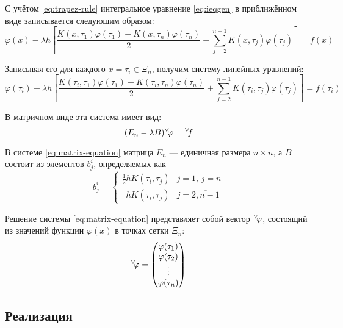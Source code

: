 \documentclass{article}
\numberwithin{equation}{section}
\renewcommand{\phi}{\varphi}
\renewcommand{\vec}[1]{{}^{\vee}\negmedspace#1}
\begin{document}
С учётом \eqref{eq:trapez-rule} интегральное уравнение
\eqref{eq:ieqgen} в приближённом виде записывается следующим образом:
\begin{equation*}
  \phi(x) - \lambda h \left[ 
    \frac{K(x,\tau_1) \phi(\tau_1) + 
      K(x,\tau_n) \phi(\tau_n)}{2} + 
    \sum_{j=2}^{n-1} K(x, \tau_{j}) \phi(\tau_{j}) 
  \right] = f(x)
\end{equation*}

Записывая его для каждого $x = \tau_i \in \Xi_n$, получим систему линейных
уравнений:
\begin{equation*}
  \phi(\tau_i) - \lambda h \left[ 
    \frac{K(\tau_i,\tau_1) \phi(\tau_1) + 
      K(\tau_i,\tau_n) \phi(\tau_n)}{2} + 
    \sum_{j=2}^{n-1} K(\tau_i, \tau_{j}) \phi(\tau_{j}) 
  \right] = f(\tau_i)
\end{equation*}

В матричном виде эта система имеет вид:
\begin{equation}
  \label{eq:matrix-equation}
  (E_n-\lambda B) \vec{\phi} = \vec{f}
\end{equation}

В системе \eqref{eq:matrix-equation} матрица $E_n$ — единичная размера
$n×n$, а $B$ состоит из элементов $b_j^i$, определяемых как
\begin{equation}
  \label{eq:B-matrix-element}
  b_j^i =
  \begin{cases}
    \frac{1}{2}hK(\tau_i, \tau_j) & j = 1,\, j = n \\
    \phantom{\frac{1}{2}} hK(\tau_i, \tau_j) & j = \overline{2,n-1}
  \end{cases}
\end{equation}

Решение системы \eqref{eq:matrix-equation} представляет собой вектор
$\vec{\phi}$, состоящий из значений функции $\phi(x)$ в точках сетки
$\Xi_n$:
\begin{equation}
  \label{eq:num-solution}
  \vec{\phi} = 
  \begin{pmatrix}
    \phi(\tau_1) \\
    \phi(\tau_2) \\
    \vdots \\
    \phi(\tau_n)
  \end{pmatrix}
\end{equation}

\subsection{Реализация}
\label{sec:numeric-implementation}
\end{document}
